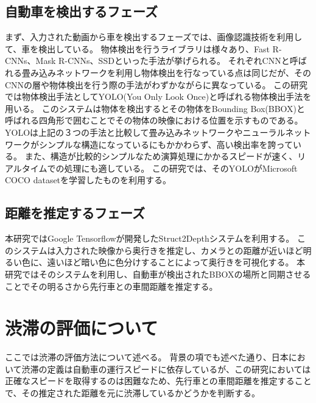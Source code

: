 \subsection{自動車を検出するフェーズ}
まず、入力された動画から車を検出するフェーズでは、画像認識技術を利用して、車を検出している。
物体検出を行うライブラリは様々あり、Fast R-CNNs、Mask R-CNNs、SSDといった手法が挙げられる。
それぞれCNNと呼ばれる畳み込みネットワークを利用し物体検出を行なっている点は同じだが、そのCNNの層や物体検出を行う際の手法がわずかながらに異なっている。
この研究では物体検出手法としてYOLO(You Only Look Once)と呼ばれる物体検出手法を用いる。
このシステムは物体を検出するとその物体をBounding Box(BBOX)と呼ばれる四角形で囲むことでその物体の映像における位置を示すものである。
YOLOは上記の３つの手法と比較して畳み込みネットワークやニューラルネットワークがシンプルな構造になっているにもかかわらず、高い検出率を誇っている。
また、構造が比較的シンプルなため演算処理にかかるスピードが速く、リアルタイムでの処理にも適している。
この研究では、そのYOLOがMicrosoft COCO datasetを学習したものを利用する。

\subsection{距離を推定するフェーズ}
本研究ではGoogle Tensorflowが開発したStruct2Depthシステムを利用する。
このシステムは入力された映像から奥行きを推定し、カメラとの距離が近いほど明るい色に、遠いほど暗い色に色分けすることによって奥行きを可視化する。
本研究ではそのシステムを利用し、自動車が検出されたBBOXの場所と同期させることでその明るさから先行車との車間距離を推定する。


\section{渋滞の評価について}
ここでは渋滞の評価方法について述べる。
背景の項でも述べた通り、日本において渋滞の定義は自動車の運行スピードに依存しているが、この研究においては正確なスピードを取得するのは困難なため、先行車との車間距離を推定することで、その推定された距離を元に渋滞しているかどうかを判断する。

